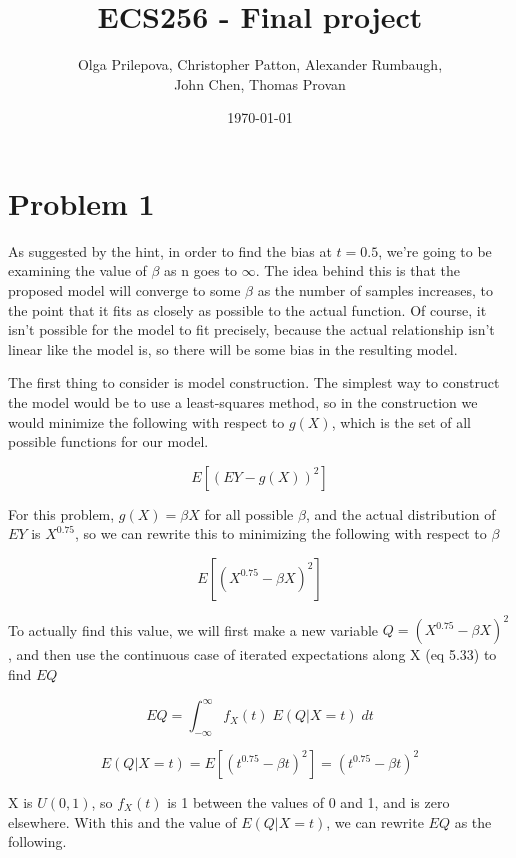 \documentclass[letter]{article}
\author{Olga Prilepova, Christopher Patton, Alexander Rumbaugh, \\ John Chen, Thomas Provan}
\date{\today}
\title{ECS256 - Final project}
\begin{document}
\maketitle


\section*{Problem 1} 

As suggested by the hint, in order to find the bias at $t=0.5$, we're going to be examining the value of $\beta$ as n goes to $\infty$. The idea behind this is that the proposed model will converge to some $\beta$ as the number of samples increases, to the point that it fits as closely as possible to the actual function. Of course, it isn't possible for the model to fit precisely, because the actual relationship isn't linear like the model is, so there will be some bias in the resulting model. 

The first thing to consider is model construction. The simplest way to construct the model would be to use a least-squares method, so in the construction we would  minimize the following with respect to $g(X)$, which is the set of all possible functions for our model.

\begin{equation}
	E[(EY - g(X))^2]
\end{equation}

For this problem, $g(X)=\beta X$ for all possible $\beta$, and the actual distribution of $EY$ is $X^{0.75}$, so we can rewrite this to minimizing the following with respect to $\beta$

\begin{equation}
	E[(X^{0.75} - \beta X)^2]
\end{equation}

To actually find this value, we will first make a new variable $Q=(X^{0.75} - \beta X)^2$, and then use the continuous case of iterated expectations along X (eq 5.33) to find $EQ$

\begin{equation}
	EQ = \int _{-\infty} ^\infty f_X(t) \; E(Q | X = t)\; dt
\end{equation}

\begin{equation}
	E(Q | X = t) = E[(t^{0.75} - \beta t)^2] = (t^{0.75} - \beta t)^2
\end{equation}

X is $U(0,1)$, so $f_X(t)$ is 1 between the values of 0 and 1, and is zero elsewhere. With this and the value of $E(Q | X = t)$, we can rewrite $EQ$ as the following.
\end{document}
